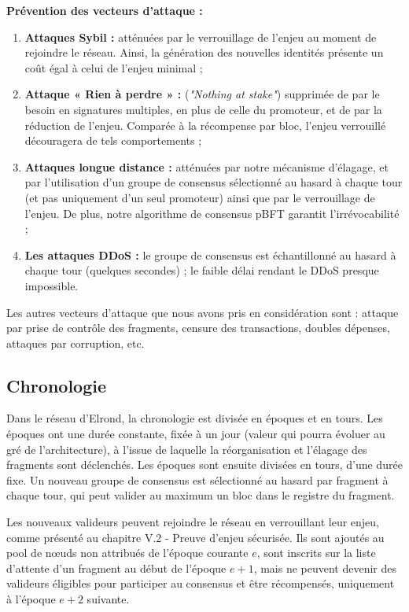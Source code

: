 \documentclass[journal]{IEEEtran}
\begin{document}
\textbf{Prévention des vecteurs d'attaque :}
\begin{enumerate}
 \item \textbf{Attaques Sybil : }atténuées par le verrouillage de l’enjeu au moment de rejoindre le réseau. Ainsi, la génération des nouvelles identités présente un coût égal à celui de l'enjeu minimal ;
 \item \textbf{Attaque « Rien à perdre » : } (\textit{"Nothing at stake"}) supprimée de par le besoin en signatures multiples, en plus de celle du promoteur, et de par la réduction de l'enjeu. Comparée à la récompense par bloc, l'enjeu verrouillé découragera de tels comportements ;
 \item \textbf{Attaques longue distance : }atténuées par notre mécanisme d'élagage, et par l'utilisation d'un groupe de consensus sélectionné au hasard à chaque tour (et pas uniquement d’un seul promoteur) ainsi que par le verrouillage de l'enjeu. De plus, notre algorithme de consensus pBFT garantit l’irrévocabilité ;
 \item \textbf{Les attaques DDoS : }le groupe de consensus est échantillonné au hasard à chaque tour (quelques secondes) ; le faible délai rendant le DDoS presque impossible.
\end{enumerate}
Les autres vecteurs d'attaque que nous avons pris en considération sont : attaque par prise de contrôle des fragments, censure des transactions, doubles dépenses, attaques par corruption, etc.

\subsection{Chronologie} 
Dans le réseau d'Elrond, la chronologie est divisée en époques et en tours. Les époques ont une durée constante, fixée à un jour (valeur qui pourra évoluer au gré de l’architecture), à l'issue de laquelle la réorganisation et l'élagage des fragments sont déclenchés. Les époques sont ensuite divisées en tours, d'une durée fixe. Un nouveau groupe de consensus est sélectionné au hasard par fragment à chaque tour, qui peut valider au maximum un bloc dans le registre du fragment.

Les nouveaux valideurs peuvent rejoindre le réseau en verrouillant leur enjeu, comme présenté au chapitre V.2 - Preuve d'enjeu sécurisée. Ils sont ajoutés au pool de nœuds non attribués de l'époque courante $e$, sont inscrits sur la liste d'attente d’un fragment au début de l'époque $e + 1$, mais ne peuvent devenir des valideurs éligibles pour participer au consensus et être récompensés, uniquement à l'époque $e + 2$ suivante.
\end{document}
